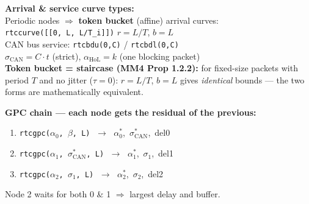 \documentclass[10pt,a4paper]{article}
\begin{document}
\begin{minipage}[t]{0.60\textwidth}
\begin{notebox}
\small\textbf{Arrival \& service curve types:}\\
Periodic nodes $\Rightarrow$ \textbf{token bucket} (affine) arrival curves:\\[1pt]
\texttt{rtccurve([[0, L, L/T\_i]])} \quad $r = L/T$, $b = L$\\[3pt]
CAN bus service: \texttt{rtcbdu(0,C)} / \texttt{rtcbdl(0,C)}\\[2pt]
$\sigma_{\text{CAN}} = C\cdot t$ (strict), $\alpha_{\text{HoL}}=k$ (one blocking packet)\\[4pt]
\textbf{Token bucket = staircase (MM4 Prop 1.2.2):} for fixed-size packets with period $T$ and no jitter ($\tau{=}0$): $r=L/T$, $b=L$ gives \emph{identical} bounds --- the two forms are mathematically equivalent.
\end{notebox}
\vspace{3pt}
\begin{keybox}
\small\textbf{GPC chain --- each node gets the residual of the previous:}
\begin{enumerate}[leftmargin=1.5em, itemsep=1pt]
  \item \texttt{rtcgpc($\alpha_0$, $\beta$, L)} $\;\to\;$ $\alpha_0^*$,\, $\sigma^*_{\text{CAN}}$,\, del0
  \item \texttt{rtcgpc($\alpha_1$, $\sigma^*_{\text{CAN}}$, L)} $\;\to\;$ $\alpha_1^*$,\, $\sigma_1$,\, del1
  \item \texttt{rtcgpc($\alpha_2$, $\sigma_1$, L)} $\;\to\;$ $\alpha_2^*$,\, $\sigma_2$,\, del2
\end{enumerate}
Node 2 waits for both 0 \& 1 $\Rightarrow$ largest delay and buffer.
\end{keybox}
\end{minipage}
\end{document}
